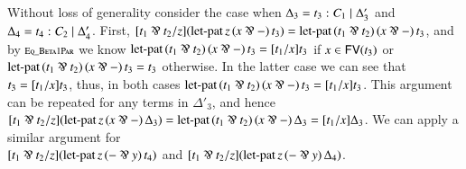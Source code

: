 \begin{report}
\begin{itemize}
Without loss of generality consider the case when
$\Delta_{{\mathrm{3}}} =  \mathit{t_{{\mathrm{3}}}}  :  \mathit{C_{{\mathrm{1}}}}  \mid  \Delta'_{{\mathrm{3}}} $ and $\Delta_{{\mathrm{4}}} =  \mathit{t_{{\mathrm{4}}}}  :  \mathit{C_{{\mathrm{2}}}}  \mid  \Delta'_{{\mathrm{4}}} $.  First,
$\FILLsym{[}   \FILLnt{t_{{\mathrm{1}}}}  \parr  \FILLnt{t_{{\mathrm{2}}}}   \FILLsym{/}  \FILLmv{z}  \FILLsym{]}   (  \mathsf{\operatorname{let-pat} }\, \FILLmv{z} \, \FILLsym{(}   \FILLmv{x}  \parr   -    \FILLsym{)} \, \FILLnt{t_{{\mathrm{3}}}}  )   \FILLsym{=}   \mathsf{\operatorname{let-pat} }\,  (  \FILLnt{t_{{\mathrm{1}}}}  \parr  \FILLnt{t_{{\mathrm{2}}}}  )  \, \FILLsym{(}   \FILLmv{x}  \parr   -    \FILLsym{)} \, \FILLnt{t_{{\mathrm{3}}}} $,
and by $\scriptsize \textsc{Eq\_Beta1Par}$ we know
$ \mathsf{\operatorname{let-pat} }\,  (  \FILLnt{t_{{\mathrm{1}}}}  \parr  \FILLnt{t_{{\mathrm{2}}}}  )  \, \FILLsym{(}   \FILLmv{x}  \parr   -    \FILLsym{)} \, \FILLnt{t_{{\mathrm{3}}}}   \FILLsym{=}  \FILLsym{[}  \FILLnt{t_{{\mathrm{1}}}}  \FILLsym{/}  \FILLmv{x}  \FILLsym{]}  \FILLnt{t_{{\mathrm{3}}}}$ if $ \mathit{x}  \in \mathsf{FV}(  \mathit{t_{{\mathrm{3}}}}  ) $
or $ \mathsf{\operatorname{let-pat} }\,  (  \FILLnt{t_{{\mathrm{1}}}}  \parr  \FILLnt{t_{{\mathrm{2}}}}  )  \, \FILLsym{(}   \FILLmv{x}  \parr   -    \FILLsym{)} \, \FILLnt{t_{{\mathrm{3}}}}   \FILLsym{=}  \FILLnt{t_{{\mathrm{3}}}}$ otherwise.  In the
latter case we can see that $\mathit{t_{{\mathrm{3}}}}  =  [  \mathit{t_{{\mathrm{1}}}}  /  \mathit{x}  ]  \mathit{t_{{\mathrm{3}}}}$, thus, in both cases
$ \mathsf{\operatorname{let-pat} }\,  (  \FILLnt{t_{{\mathrm{1}}}}  \parr  \FILLnt{t_{{\mathrm{2}}}}  )  \, \FILLsym{(}   \FILLmv{x}  \parr   -    \FILLsym{)} \, \FILLnt{t_{{\mathrm{3}}}}   \FILLsym{=}  \FILLsym{[}  \FILLnt{t_{{\mathrm{1}}}}  \FILLsym{/}  \FILLmv{x}  \FILLsym{]}  \FILLnt{t_{{\mathrm{3}}}}$.  This argument can
be repeated for any terms in $\Delta'_{{\mathrm{3}}}$, and hence
$\FILLsym{[}   \FILLnt{t_{{\mathrm{1}}}}  \parr  \FILLnt{t_{{\mathrm{2}}}}   \FILLsym{/}  \FILLmv{z}  \FILLsym{]}  \FILLsym{(}   \mathsf{\operatorname{let-pat} }\, \FILLmv{z} \, \FILLsym{(}   \FILLmv{x}  \parr   -    \FILLsym{)} \, \Delta_{{\mathrm{3}}}   \FILLsym{)} =  \mathsf{\operatorname{let-pat} }\,  (  \FILLnt{t_{{\mathrm{1}}}}  \parr  \FILLnt{t_{{\mathrm{2}}}}  )  \, \FILLsym{(}   \FILLmv{x}  \parr   -    \FILLsym{)} \, \Delta_{{\mathrm{3}}}   \FILLsym{=}  \FILLsym{[}  \FILLnt{t_{{\mathrm{1}}}}  \FILLsym{/}  \FILLmv{x}  \FILLsym{]}  \Delta_{{\mathrm{3}}}$.
We can apply a similar argument for\\
$\FILLsym{[}   \FILLnt{t_{{\mathrm{1}}}}  \parr  \FILLnt{t_{{\mathrm{2}}}}   \FILLsym{/}  \FILLmv{z}  \FILLsym{]}   (  \mathsf{\operatorname{let-pat} }\, \FILLmv{z} \, \FILLsym{(}    -   \parr  \FILLmv{y}   \FILLsym{)} \, \FILLnt{t_{{\mathrm{4}}}}  ) $ and
$\FILLsym{[}   \FILLnt{t_{{\mathrm{1}}}}  \parr  \FILLnt{t_{{\mathrm{2}}}}   \FILLsym{/}  \FILLmv{z}  \FILLsym{]}  \FILLsym{(}   \mathsf{\operatorname{let-pat} }\, \FILLmv{z} \, \FILLsym{(}    -   \parr  \FILLmv{y}   \FILLsym{)} \, \Delta_{{\mathrm{4}}}   \FILLsym{)}$.



\end{itemize}
\end{report}
